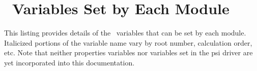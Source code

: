 \section{\PSI\ Variables Set by Each Module}\label{variableslist}
This listing provides details of the \PSI\ variables that can be set
by each module. Italicized portions of the variable name vary by root
number, calculation order, etc. Note that neither properties variables 
nor variables set in the psi driver are yet incorporated into this documentation.



